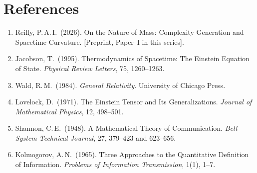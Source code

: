\documentclass[12pt]{article}
\begin{document}
\section*{References}

\begin{enumerate}

  \item\label{Reilly2026}
        Reilly, P.\,A.\,I.\ (2026).
        On the Nature of Mass: Complexity Generation and
        Spacetime Curvature. [Preprint, Paper~I in this series].

  \item\label{Jacobson1995}
        Jacobson, T.\ (1995).
        Thermodynamics of Spacetime: The Einstein Equation
        of State.
        \textit{Physical Review Letters}, 75, 1260--1263.

  \item\label{Wald1984}
        Wald, R.\,M.\ (1984).
        \textit{General Relativity}.
        University of Chicago Press.

  \item\label{Lovelock1971}
        Lovelock, D.\ (1971).
        The Einstein Tensor and Its Generalizations.
        \textit{Journal of Mathematical Physics}, 12, 498--501.

  \item\label{Shannon1948}
        Shannon, C.\,E.\ (1948).
        A Mathematical Theory of Communication.
        \textit{Bell System Technical Journal},
        27, 379--423 and 623--656.

  \item\label{Kolmogorov1965}
        Kolmogorov, A.\,N.\ (1965).
        Three Approaches to the Quantitative Definition
        of Information.
        \textit{Problems of Information Transmission},
        1(1), 1--7.

\end{enumerate}
\end{document}
